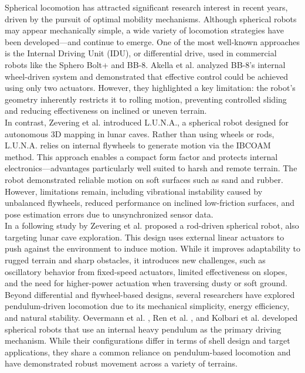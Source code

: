 \documentclass[conference]{IEEEtran}
\begin{document}
\hspace*{1em}Spherical locomotion has attracted significant research interest in recent years, driven by the pursuit of optimal mobility mechanisms. Although spherical robots may appear mechanically simple, a wide variety of locomotion strategies have been developed—and continue to emerge. One of the most well-known approaches is the Internal Driving Unit (IDU), or differential drive, used in commercial robots like the Sphero Bolt+ and BB-8. Akella et al.\cite{Sphero} analyzed BB-8’s internal wheel-driven system and demonstrated that effective control could be achieved using only two actuators. However, they highlighted a key limitation: the robot’s geometry inherently restricts it to rolling motion, preventing controlled sliding and reducing effectiveness on inclined or uneven terrain.\\
\hspace*{1em}In contrast, Zevering et al.\cite{luna} introduced L.U.N.A., a spherical robot designed for autonomous 3D mapping in lunar caves. Rather than using wheels or rods, L.U.N.A. relies on internal flywheels to generate motion via the IBCOAM method. This approach enables a compact form factor and protects internal electronics—advantages particularly well suited to harsh and remote terrain. The robot demonstrated reliable motion on soft surfaces such as sand and rubber. However, limitations remain, including vibrational instability caused by unbalanced flywheels, reduced performance on inclined low-friction surfaces, and pose estimation errors due to unsynchronized sensor data.\\
\hspace*{1em}In a following study by Zevering et al.\cite{rod_sphere} proposed a rod-driven spherical robot, also targeting lunar cave exploration. This design uses external linear actuators to push against the environment to induce motion. While it improves adaptability to rugged terrain and sharp obstacles, it introduces new challenges, such as oscillatory behavior from fixed-speed actuators, limited effectiveness on slopes, and the need for higher-power actuation when traversing dusty or soft ground.\\
\hspace*{1em}Beyond differential and flywheel-based designs, several researchers have explored pendulum-driven locomotion due to its mechanical simplicity, energy efficiency, and natural stability. Oevermann et al. \cite{roboball}, Ren et al. \cite{novelsphere}, and  Kolbari et al. \cite{pendulum_sphere} developed spherical robots that use an internal heavy pendulum as the primary driving mechanism. While their configurations differ in terms of shell design and target applications, they share a common reliance on pendulum-based locomotion and have demonstrated robust movement across a variety of terrains.\\
\end{document}
